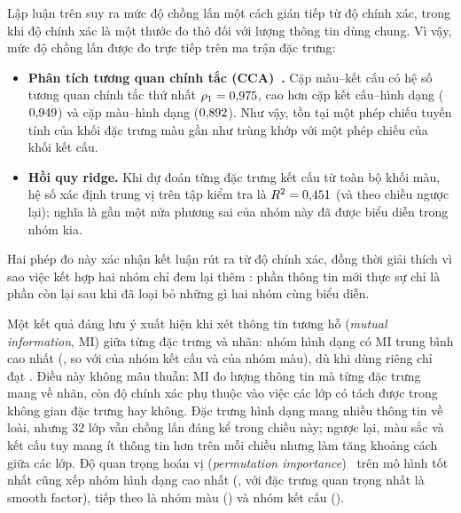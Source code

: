 \documentclass[11pt,a4paper]{article}
\begin{document}
Lập luận trên suy ra mức độ chồng lấn một cách gián tiếp từ độ chính xác, trong khi độ chính xác là
một thước đo thô đối với lượng thông tin dùng chung. Vì vậy, mức độ chồng lấn được đo trực tiếp trên
ma trận đặc trưng:
\begin{itemize}
  \item \textbf{Phân tích tương quan chính tắc (CCA)~\cite{hotelling1936}.} Cặp màu--kết cấu có hệ số
        tương quan chính tắc thứ nhất $\rho_1 = 0{,}975{}$, cao hơn cặp kết cấu--hình dạng
        ($0{,}949{}$) và cặp màu--hình dạng ($0{,}892{}$). Như vậy, tồn tại một phép
        chiếu tuyến tính của khối đặc trưng màu gần như trùng khớp với một phép chiếu của khối kết cấu.
  \item \textbf{Hồi quy ridge.} Khi dự đoán từng đặc trưng kết cấu từ toàn bộ khối màu, hệ số xác định
        trung vị trên tập kiểm tra là $R^2 = 0{,}451{}$ (và \rtwotexturecolor{} theo chiều
        ngược lại); nghĩa là gần một nửa phương sai của nhóm này đã được biểu diễn trong nhóm kia.
\end{itemize}

Hai phép đo này xác nhận kết luận rút ra từ độ chính xác, đồng thời giải thích vì sao việc kết hợp
hai nhóm chỉ đem lại thêm \texturegain{}: phần thông tin mới thực sự chỉ là phần còn lại sau khi đã
loại bỏ những gì hai nhóm cùng biểu diễn.

Một kết quả đáng lưu ý xuất hiện khi xét thông tin tương hỗ (\emph{mutual information}, MI) giữa từng
đặc trưng và nhãn: nhóm hình dạng có MI trung bình cao nhất (\mishape{}, so với \mitexture{} của nhóm
kết cấu và \micolor{} của nhóm màu), dù khi dùng riêng chỉ đạt \shapeonlyacc{}. Điều này không mâu
thuẫn: MI đo lượng thông tin mà từng đặc trưng mang về nhãn, còn độ chính xác phụ thuộc vào việc các
lớp có tách được trong không gian đặc trưng hay không. Đặc trưng hình dạng mang nhiều thông tin về loài,
nhưng 32 lớp vẫn chồng lấn đáng kể trong \shapedims{} chiều này; ngược lại, màu sắc và kết cấu tuy
mang ít thông tin hơn trên mỗi chiều nhưng làm tăng khoảng cách giữa các lớp. Độ quan trọng hoán vị
(\emph{permutation importance})~\cite{breiman2001} trên mô hình tốt nhất cũng xếp nhóm hình dạng cao
nhất (\impshape{}, với đặc trưng quan trọng nhất là smooth factor), tiếp theo là nhóm màu
(\impcolor{}) và nhóm kết cấu (\imptexture{}).
\end{document}
